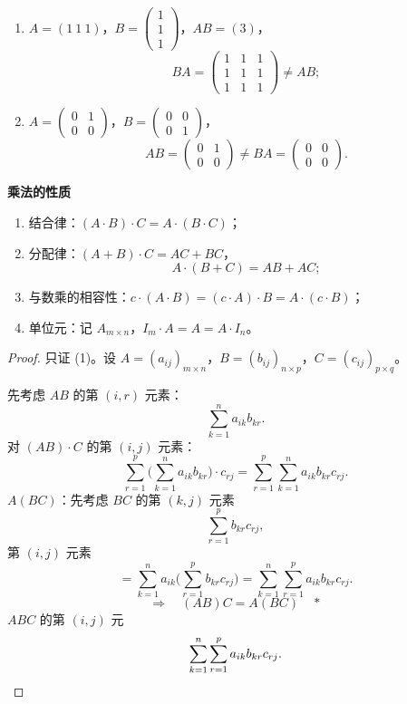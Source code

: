 \begin{enumerate}[label=(\arabic*)]
\item $A=(1\ 1\ 1)$，$B=\begin{pmatrix}1\\1\\1\end{pmatrix}$，$AB=(3)$，
\[
BA=\begin{pmatrix}
1 & 1 & 1\\
1 & 1 & 1\\
1 & 1 & 1
\end{pmatrix}\ne AB;
\]
\item $A=\begin{pmatrix}0 & 1\\0 & 0\end{pmatrix}$，$B=\begin{pmatrix}0 & 0\\0 & 1\end{pmatrix}$，
\[
AB=\begin{pmatrix}0 & 1\\0 & 0\end{pmatrix}\ne BA=\begin{pmatrix}0 & 0\\0 & 0\end{pmatrix}.
\]
\end{enumerate}

\textbf{乘法的性质}
\begin{enumerate}[label=(\arabic*)]
\item 结合律：$(A\cdot B)\cdot C=A\cdot(B\cdot C)$；
\item 分配律：$(A+B)\cdot C=AC+BC$，
\[
A\cdot(B+C)=AB+AC;
\]
\item 与数乘的相容性：$c\cdot(A\cdot B)=(c\cdot A)\cdot B=A\cdot(c\cdot B)$；
\item 单位元：记 $A_{m\times n}$，$I_m\cdot A=A=A\cdot I_n$。
\end{enumerate}

\begin{proof}
只证 (1)。设 $A=(a_{ij})_{m\times n}$，$B=(b_{ij})_{n\times p}$，$C=(c_{ij})_{p\times q}$。

先考虑 $AB$ 的第 $(i,r)$ 元素：
\[
\sum_{k=1}^{n}a_{ik}b_{kr}.
\]
对 $(AB)\cdot C$ 的第 $(i,j)$ 元素：
\[
\sum_{r=1}^{p}\Big(\sum_{k=1}^{n}a_{ik}b_{kr}\Big)\cdot c_{rj}
=\sum_{r=1}^{p}\sum_{k=1}^{n}a_{ik}b_{kr}c_{rj}.
\]
$A(BC)$：先考虑 $BC$ 的第 $(k,j)$ 元素
\[
\sum_{r=1}^{p}b_{kr}c_{rj},
\]
第 $(i,j)$ 元素
\[
=\sum_{k=1}^{n}a_{ik}\Big(\sum_{r=1}^{p}b_{kr}c_{rj}\Big)
=\sum_{k=1}^{n}\sum_{r=1}^{p}a_{ik}b_{kr}c_{rj}.
\]
\[
\Rightarrow\quad(AB)C=A(BC)\quad\ast
\]
$ABC$ 的第 $(i,j)$ 元
\[
\sum_{k=1}^{n}\sum_{r=1}^{p}a_{ik}b_{kr}c_{rj}.\qedhere
\]
\end{proof}

